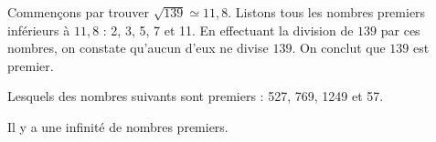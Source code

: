 \begin{prop}
\begin{ex}
                        Commen\c{c}ons par trouver $\sqrt{139} \simeq 11,8$.
                        Listons tous les nombres premiers inf\'erieurs \`a $11,8$ : 
                              2, 3, 5, 7 et 11.
                        En effectuant la division de $139$ par ces nombres, on constate qu'aucun d'eux ne divise $139$.
                        On conclut que $139$ est premier.
                  \end{ex}
                  \begin{exe}
                        Lesquels des nombres suivants sont premiers : 
                              527, 769, 1249 et 
                              57.
                  \end{exe}
            \end{prop}
            \begin{thm}
                  Il y a une infinit\'e de nombres premiers.
            \end{thm}
